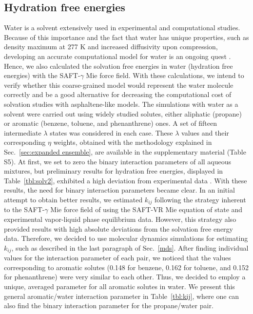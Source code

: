 \documentclass[preprint]{elsarticle}
\begin{document}
	\subsection{Hydration free energies}
	
	Water is a solvent extensively used in experimental and computational studies.
	Because of this importance and the fact that water has unique properties, such as density maximum at 277 K and increased diffusivity upon compression, developing an accurate computational model for water is an ongoing quest \cite{hadley2012}.
	Hence, we also calculated the solvation free energies in water (hydration free energies) with the SAFT-$\gamma$ Mie force field.
	With these calculations, we intend to verify whether this coarse-grained model would represent the water molecule correctly and be a good alternative for decreasing the computational cost of solvation studies with asphaltene-like models.
	The simulations with water as a solvent were carried out using widely studied solutes, either aliphatic (propane) or aromatic (benzene, toluene, and phenanthrene) ones.
	A set of fifteen intermediate $\lambda$ states was considered in each case.
	These $\lambda$ values and their corresponding $\eta$ weights, obtained with the methodology explained in Sec.~\ref{sec:expanded ensemble}, are available in the supplementary material (Table S5).
	At first, we set to zero the binary interaction parameters of all aqueous mixtures, but preliminary results for hydration free energies, displayed in Table~\ref{tbl:solv2}, exhibited a high deviation from experimental data \cite{P29900000291, doi:10.1021/ct050097l}.
	With these results, the need for binary interaction parameters became clear.
	In an initial attempt to obtain better results, we estimated $k_{ij}$ following the strategy inherent to the SAFT-$\gamma$ Mie force field of using the SAFT-VR Mie equation of state and experimental vapor-liquid phase equilibrium data.
	However, this strategy also provided results with high absolute deviations from the solvation free energy data.
	Therefore, we decided to use molecular dynamics simulations for estimating $k_{ij}$, such as described in the last paragraph of Sec.~\ref{mds}.
	After finding individual values for the interaction parameter of each pair, we noticed that the values corresponding to aromatic solutes (0.148 for benzene, 0.162 for toluene, and 0.152 for phenanthrene) were very similar to each other.
	Thus, we decided to employ a unique, averaged parameter for all aromatic solutes in water.
	We present this general aromatic/water interaction parameter in Table~\ref{tbl:kij}, where one can also find the binary interaction parameter for the propane/water pair.
	
\end{document}

